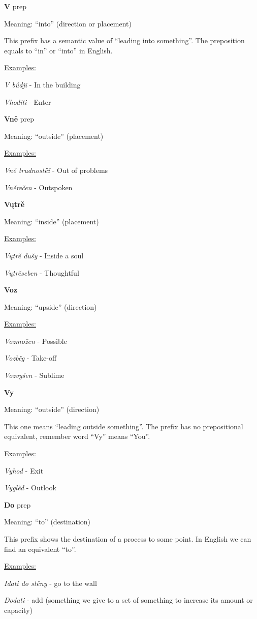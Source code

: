 \textbf{V} \gls{prep}

Meaning: “into” (direction or placement)

This prefix has a semantic value of “leading into something”. The preposition equals to “in” or “into” in English.

\underline{Examples:}

\textit{V búdji }- In the building

\textit{Vhoditi} - Enter

\textbf{Vně} \gls{prep}

Meaning: “outside” (placement)

\underline{Examples:}

\textit{Vně trudnostëǐ} - Out of problems

\textit{Vněrečen} - Outspoken

\textbf{Vųtrě}

Meaning: “inside” (placement)

\underline{Examples:}

\textit{Vųtrě dušy} - Inside a soul

\textit{Vųtrěseben} - Thoughtful

\textbf{Voz}

Meaning: “upside” (direction)

\underline{Examples:}

\textit{Vozmožen} - Possible

\textit{Vozběg} - Take-off

\textit{Vozvyšen} - Sublime

\textbf{Vy}

Meaning: “outside” (direction)

This one means “leading outside something”. The prefix has no prepositional equivalent, remember word “Vy” means “You”.

\underline{Examples:}

\textit{Vyhod} - Exit

\textit{Vyglěd} - Outlook

\textbf{Do} \gls{prep}

Meaning: “to” (destination)

This prefix shows the destination of a process to some point. In English we can find an equivalent “to”.

\underline{Examples:}

\textit{Idati do stěny }- go to the wall

\textit{Dodati} - add (something we give to a set of something to increase its amount or capacity)

